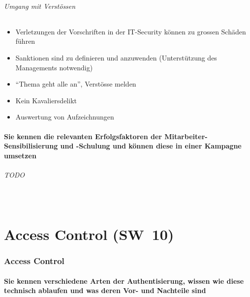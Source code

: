 \documentclass[10pt,a4paper]{article}
\begin{document}
\paragraph*{Umgang mit Verstössen}
\begin{itemize}[noitemsep,topsep=0pt,leftmargin=*]
    \item Verletzungen der Vorschriften in der IT-Security können zu grossen Schäden führen
    \item Sanktionen sind zu definieren und anzuwenden (Unterstützung des Managements notwendig)
    \item "`Thema geht alle an"', Verstösse melden
    \item Kein Kavaliersdelikt
    \item Auswertung von Aufzeichnungen
\end{itemize}

\subsection*{Sie kennen die relevanten Erfolgsfaktoren der Mitarbeiter-Sensibilisierung und -Schulung und können diese in einer Kampagne umsetzen}
\paragraph*{TODO}\ \


\pagebreak
\part{Access Control (SW~10)}
\section{Access Control}

\subsection*{Sie kennen verschiedene Arten der Authentisierung, wissen wie diese technisch ablaufen und was deren Vor- und Nachteile sind}
\end{document}
